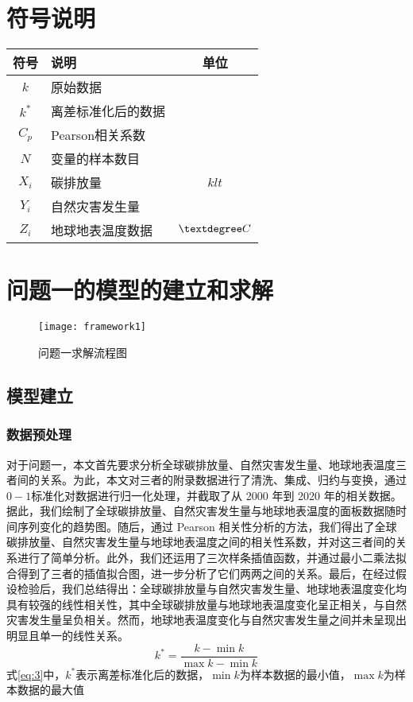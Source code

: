 \documentclass[withoutpreface,bwprint]{cumcmthesis}
\begin{document}
\section{符号说明}
\begin{table}[H]
	\centering
	\begin{tabularx}{\textwidth}{CLC}
		\toprule
		符号    & 说明    & 单位 \\
		\midrule
		$k     $& 原始数据 & $ $ \\
		$k^*     $& 离差标准化后的数据 & $ $ \\
		$C_p     $& Pearson相关系数 & $ $ \\
		$N     $& 变量的样本数目 & $ $ \\
		$X_i     $& 碳排放量 & $klt$ \\
		$Y_i     $& 自然灾害发生量 & $ $ \\
		$Z_i     $& 地球地表温度数据 & $\textdegree C$ \\

		\bottomrule
	\end{tabularx}
	\label{tab:符号说明}
\end{table}



\section{问题一的模型的建立和求解}

\begin{figure}[htbp]
	\centering
	\texttt{[image: framework1]}
	\caption{问题一求解流程图}
	\label{fig:framework1}
\end{figure}

\subsection{模型建立}
\subsubsection{数据预处理}
对于问题一，本文首先要求分析全球碳排放量、自然灾害发生量、地球地表温度三者间的关系。为此，本文对三者的附录数据进行了清洗、集成、归约与变换，通过$0-1$标准化对数据进行归一化处理，并截取了从 2000 年到 2020 年的相关数据。据此，我们绘制了全球碳排放量、自然灾害发生量与地球地表温度的面板数据随时间序列变化的趋势图。随后，通过 Pearson 相关性分析的方法，我们得出了全球碳排放量、自然灾害发生量与地球地表温度之间的相关性系数，并对这三者间的关系进行了简单分析。此外，我们还运用了三次样条插值函数，并通过最小二乘法拟合得到了三者的插值拟合图，进一步分析了它们两两之间的关系。最后，在经过假设检验后，我们总结得出：全球碳排放量与自然灾害发生量、地球地表温度变化均具有较强的线性相关性，其中全球碳排放量与地球地表温度变化呈正相关，与自然灾害发生量呈负相关。然而，地球地表温度变化与自然灾害发生量之间并未呈现出明显且单一的线性关系。
\begin{equation}
\label{eq:3}	
	{{k}^{*}}=\frac{k-\min{k}}{\max{k}-\min{k}}
\end{equation}
式\eqref{eq:3}中，${k^*}$表示离差标准化后的数据，$\min k$为样本数据的最小值，$\max k$为样本数据的最大值
\end{document}
